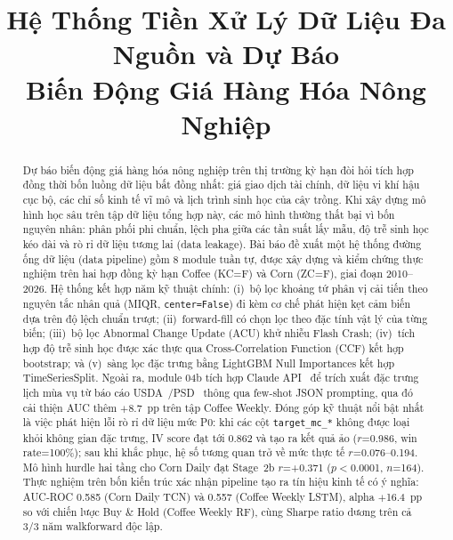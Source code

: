 \documentclass[conference]{IEEEtran}
\begin{document}
\title{Hệ Thống Tiền Xử Lý Dữ Liệu Đa Nguồn và Dự Báo\\
Biến Động Giá Hàng Hóa Nông Nghiệp}
\author{
\and
{}
}
\maketitle
\begin{abstract}
Dự báo biến động giá hàng hóa nông nghiệp trên thị trường kỳ hạn đòi hỏi
tích hợp đồng thời bốn luồng dữ liệu bất đồng nhất: giá giao dịch tài chính,
dữ liệu vi khí hậu cục bộ, các chỉ số kinh tế vĩ mô và lịch trình sinh học
của cây trồng. Khi xây dựng mô hình học sâu trên tập dữ liệu tổng hợp này,
các mô hình thường thất bại vì bốn nguyên nhân: phân phối phi chuẩn, lệch
pha giữa các tần suất lấy mẫu, độ trễ sinh học kéo dài và rò rỉ dữ liệu
tương lai (data leakage).
Bài báo đề xuất một hệ thống đường ống dữ liệu (data pipeline) gồm 8 module
tuần tự, được xây dựng và kiểm chứng thực nghiệm trên hai hợp đồng kỳ hạn
Coffee (KC=F) và Corn (ZC=F), giai đoạn 2010--2026. Hệ thống kết hợp năm kỹ
thuật chính: (i)~bộ lọc khoảng tứ phân vị cải tiến theo nguyên tắc nhân quả
(MIQR, \texttt{center=False}) đi kèm cơ chế phát hiện kẹt cảm biến dựa trên
độ lệch chuẩn trượt; (ii)~forward-fill có chọn lọc theo đặc tính vật lý của
từng biến; (iii)~bộ lọc Abnormal Change Update (ACU) khử nhiễu Flash Crash;
(iv)~tích hợp độ trễ sinh học được xác thực qua Cross-Correlation Function
(CCF) kết hợp bootstrap; và (v)~sàng lọc đặc trưng bằng LightGBM Null
Importances kết hợp TimeSeriesSplit. Ngoài ra, module 04b tích hợp Claude
API~\cite{anthropic2024} để trích xuất đặc trưng lịch mùa vụ từ báo cáo
USDA~\cite{usda_nass}/PSD~\cite{usda_fas} thông qua few-shot JSON prompting,
qua đó cải thiện AUC thêm $+$8.7~pp trên tập Coffee Weekly.
Đóng góp kỹ thuật nổi bật nhất là việc phát hiện lỗi rò rỉ dữ liệu mức P0:
khi các cột \texttt{target\_mc\_*} không được loại khỏi không gian đặc trưng,
IV score đạt tới 0.862 và tạo ra kết quả ảo ($r$=0.986, win rate=100\%); sau
khi khắc phục, hệ số tương quan trở về mức thực tế $r$=0.076--0.194. Mô hình
hurdle hai tầng cho Corn Daily đạt Stage~2b $r$=+0.371 ($p<$0.0001, $n$=164).
Thực nghiệm trên bốn kiến trúc xác nhận pipeline tạo ra tín hiệu kinh tế có
ý nghĩa: AUC-ROC 0.585 (Corn Daily TCN) và 0.557 (Coffee Weekly LSTM), alpha
$+$16.4~pp so với chiến lược Buy \& Hold (Coffee Weekly RF), cùng Sharpe
ratio dương trên cả 3/3 năm walkforward độc lập.
\end{abstract}
\end{document}
